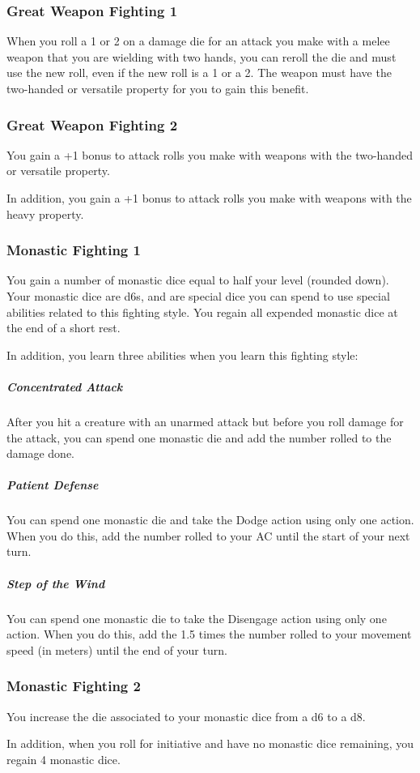 \subsubsection{Great Weapon Fighting 1}
    When you roll a 1 or 2 on a damage die for an attack you make with a melee weapon that you are wielding with two hands, you can reroll the die and must use the new roll, even if the new roll is a 1 or a 2.
    The weapon must have the two-handed or versatile property for you to gain this benefit.
\subsubsection{Great Weapon Fighting 2}
    You gain a +1 bonus to attack rolls you make with weapons with the two-handed or versatile property.

    In addition, you gain a +1 bonus to attack rolls you make with weapons with the heavy property.
\subsubsection{Monastic Fighting 1}
    You gain a number of monastic dice equal to half your level (rounded down).
    Your monastic dice are d6s, and are special dice you can spend to use special abilities related to this fighting style.
    You regain all expended monastic dice at the end of a short rest.

    In addition, you learn three abilities when you learn this fighting style:
    \subparagraph{Concentrated Attack} After you hit a creature with an unarmed attack but before you roll damage for the attack, you can spend one monastic die and add the number rolled to the damage done.
    \subparagraph{Patient Defense} You can spend one monastic die and take the Dodge action using only one action.
    When you do this, add the number rolled to your AC until the start of your next turn.
    \subparagraph{Step of the Wind} You can spend one monastic die to take the Disengage action using only one action.
    When you do this, add the 1.5 times the number rolled to your movement speed (in meters) until the end of your turn.
\subsubsection{Monastic Fighting 2}
    You increase the die associated to your monastic dice from a d6 to a d8.

    In addition, when you roll for initiative and have no monastic dice remaining, you regain 4 monastic dice.
